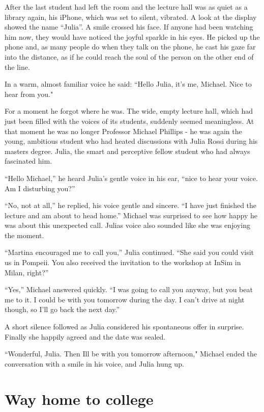 \documentclass[
]{article}
\begin{document}
After the last student had left the room and the lecture hall was as
quiet as a library again, his iPhone, which was set to silent, vibrated.
A look at the display showed the name ``Julia''. A smile crossed his
face. If anyone had been watching him now, they would have noticed the
joyful sparkle in his eyes. He picked up the phone and, as many people
do when they talk on the phone, he cast his gaze far into the distance,
as if he could reach the soul of the person on the other end of the
line.

In a warm, almost familiar voice he said: ``Hello Julia, it's me,
Michael. Nice to hear from you."

For a moment he forgot where he was. The wide, empty lecture hall, which
had just been filled with the voices of its students, suddenly seemed
meaningless. At that moment he was no longer Professor Michael Phillips
- he was again the young, ambitious student who had heated discussions
with Julia Rossi during his master\textquotesingle s degree. Julia, the
smart and perceptive fellow student who had always fascinated him.

``Hello Michael,'' he heard Julia's gentle voice in his ear, ``nice to
hear your voice. Am I disturbing you?''

``No, not at all,'' he replied, his voice gentle and sincere. ``I have
just finished the lecture and am about to head home.'' Michael was
surprised to see how happy he was about this unexpected call.
Julia\textquotesingle s voice also sounded like she was enjoying the
moment.

``Martina encouraged me to call you,'' Julia continued. ``She said you
could visit us in Pompeii. You also received the invitation to the
workshop at InSim in Milan, right?''

``Yes,'' Michael answered quickly. ``I was going to call you anyway, but
you beat me to it. I could be with you tomorrow during the day. I can't
drive at night though, so I'll go back the next day.''

A short silence followed as Julia considered his spontaneous offer in
surprise. Finally she happily agreed and the date was sealed.

``Wonderful, Julia. Then I\textquotesingle ll be with you tomorrow
afternoon," Michael ended the conversation with a smile in his voice,
and Julia hung up.

\section{Way home to college}\label{way-home-to-college}
\end{document}
